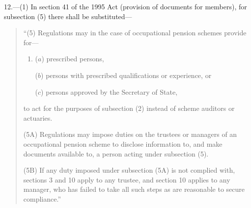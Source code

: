 \documentclass[12pt,a4paper]{article}
\begin{document}
12.---(1) In section 41 of the 1995 Act (provision of documents for members), for subsection (5)  there shall be substituted—
\begin{quotation}
“(5) Regulations may in the case of occupational pension schemes provide for—
\begin{enumerate}\item[]
($a$) prescribed persons,

($b$) persons with prescribed qualifications or experience, or

($c$) persons approved by the Secretary of State,
\end{enumerate}
to act for the purposes of subsection (2)  instead of scheme auditors or actuaries.

(5A) Regulations may impose duties on the trustees or managers of an occupational pension scheme to disclose information to, and make documents available to, a person acting under subsection (5).

(5B) If any duty imposed under subsection (5A)  is not complied with, sections 3 and 10 apply to any trustee, and section 10 applies to any manager, who has failed to take all such steps as are reasonable to secure compliance.”
\end{quotation}

%
%
%
%
%
%

\end{document}
